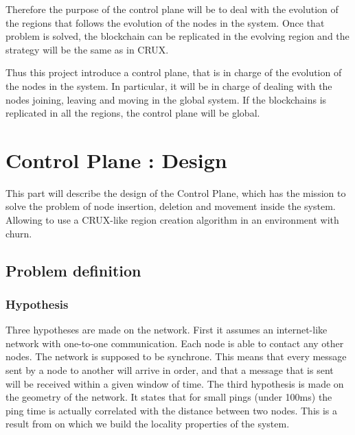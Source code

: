 \documentclass[a4paper,11pt,oneside]{report}
\begin{document}
Therefore the purpose of the control plane will be to deal with the evolution
of the regions that follows the evolution of the nodes in the system. Once that
problem is solved, the blockchain can be replicated in the evolving region and
the strategy will be the same as in CRUX. 

Thus this project introduce a control plane, that is in charge of the evolution
of the nodes in the system. In particular, it will be in charge of dealing with
the nodes joining, leaving and moving in the global system. If the blockchains
is replicated in all the regions, the control plane will be global. 

\chapter{Control Plane : Design}


This part will describe the design of the Control Plane, which has the mission
to solve the problem of node insertion, deletion and movement inside the
system. Allowing to use a CRUX-like region creation algorithm in an environment
with churn. 

\section{Problem definition}

\subsection{Hypothesis} Three hypotheses are made on the network. First it
assumes an internet-like network with one-to-one communication. Each node is
able to contact any other nodes. The network is supposed to be synchrone. This
means that every message sent by a node to another will arrive in order, and
that a message that is sent will be received within a given window of time. The
third hypothesis is made on the geometry of the network. It states that for
small pings (under 100ms) the ping time is actually correlated with the
distance between two nodes. This is a result from \cite{locality-result} on
which we build the locality properties of the system. 
\end{document}
